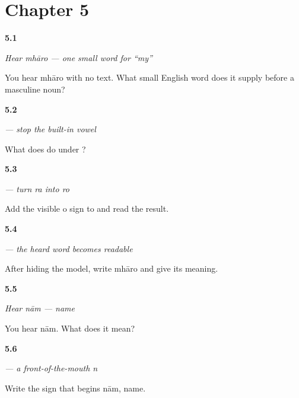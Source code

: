 \section*{Chapter 5}

\noindent\begin{minipage}[t]{\linewidth}
\raggedright
\hypertarget{review-MW-C05-hear-mharo-meaning}{\textbf{5.1}} \emph{Hear \emph{mhāro} — one small word for \textquotedblleft{}my\textquotedblright{}}\par
\small You hear mhāro with no text. What small English word does it supply before a masculine noun?
\end{minipage}\par\medskip

\noindent\begin{minipage}[t]{\linewidth}
\raggedright
\hypertarget{review-MW-W05-virama-function}{\textbf{5.2}} \emph{ — stop the built-in vowel}\par
\small What does  do under ?
\end{minipage}\par\medskip

\noindent\begin{minipage}[t]{\linewidth}
\raggedright
\hypertarget{review-MW-W05-o-matra-read}{\textbf{5.3}} \emph{ — turn \emph{ra} into \emph{ro}}\par
\small Add the visible o sign to  and read the result.
\end{minipage}\par\medskip

\noindent\begin{minipage}[t]{\linewidth}
\raggedright
\hypertarget{review-MW-C05-mharo-delayed}{\textbf{5.4}} \emph{ — the heard word becomes readable}\par
\small After hiding the model, write mhāro and give its meaning.
\end{minipage}\par\medskip

\noindent\begin{minipage}[t]{\linewidth}
\raggedright
\hypertarget{review-MW-C05-hear-naam-meaning}{\textbf{5.5}} \emph{Hear \emph{nām} — name}\par
\small You hear nām. What does it mean?
\end{minipage}\par\medskip

\noindent\begin{minipage}[t]{\linewidth}
\raggedright
\hypertarget{review-MW-W05-na-choice}{\textbf{5.6}} \emph{ — a front-of-the-mouth \emph{n}}\par
\small Write the sign that begins nām, name.
\end{minipage}\par\medskip

